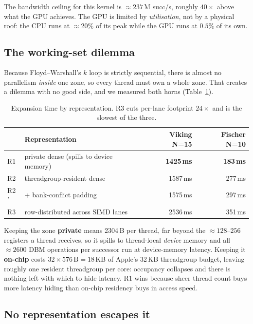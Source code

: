 The bandwidth ceiling for this kernel is ${\approx}237$\,M succ/s, roughly $40\times$ above
what the GPU achieves. The GPU is limited by \emph{utilisation}, not by a physical roof: the
CPU runs at ${\approx}20\%$ of its peak while the GPU runs at $0.5\%$ of its own.

\subsection{The working-set dilemma}
\label{sec:dilemma}

Because Floyd--Warshall's $k$ loop is strictly sequential, there is almost no parallelism
\emph{inside} one zone, so every thread must own a whole zone. That creates a dilemma with no
good side, and we measured both horns (Table~\ref{tab:reps}).

\begin{table}[t]
\centering
\caption{Expansion time by representation. R3 cuts per-lane footprint $24\times$ and is the
slowest of the three.}
\label{tab:reps}
\begin{tabular}{llrr}
\toprule
& Representation & Viking N=15 & Fischer N=10 \\
\midrule
R1 & private dense (spills to device memory) & \textbf{1425\,ms} & \textbf{183\,ms} \\
R2 & threadgroup-resident dense & 1587\,ms & 277\,ms \\
R2$'$ & \quad + bank-conflict padding & 1575\,ms & 297\,ms \\
R3 & row-distributed across SIMD lanes & 2536\,ms & 351\,ms \\
\bottomrule
\end{tabular}
\end{table}

Keeping the zone \textbf{private} means 2304\,B per thread, far beyond the ${\approx}128$--$256$
registers a thread receives, so it spills to thread-local \emph{device} memory and all
${\approx}2600$ DBM operations per successor run at device-memory latency. Keeping it
\textbf{on-chip} costs $32 \times 576\,\text{B} = 18$\,KB of Apple's 32\,KB threadgroup
budget, leaving roughly one resident threadgroup per core: occupancy collapses and there is
nothing left with which to hide latency. R1 wins because sheer thread count buys more latency
hiding than on-chip residency buys in access speed.

\subsection{No representation escapes it}
\label{sec:cooperation}

